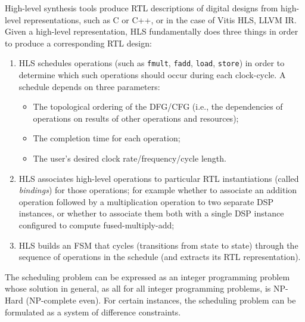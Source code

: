 High-level synthesis tools produce RTL descriptions of digital designs from high-level representations, such as C or C++\cite{10.1145/2514740, ferrandi2021bambu}, or in the case of Vitis HLS, LLVM IR.
Given a high-level representation, HLS fundamentally does three things in order to produce a corresponding RTL design:
\begin{enumerate}
	\item HLS schedules operations (such as \texttt{fmult}, \texttt{fadd}, \texttt{load}, \texttt{store}) in order to determine which such operations should occur during each clock-cycle. A schedule depends on three parameters:
	      \begin{itemize}
		      \item The topological ordering of the DFG/CFG (i.e., the dependencies of operations on results of other operations and resources);
		      \item The completion time for each operation;
		      \item The user's desired clock rate/frequency/cycle length.
	      \end{itemize}
	\item HLS associates high-level operations to particular RTL instantiations (called \emph{bindings}) for those operations;
	for example whether to associate an addition operation followed by a multiplication operation to two separate DSP instances, or whether to associate them both with a single DSP instance configured to compute fused-multiply-add;
	\item HLS builds an FSM that cycles (transitions from state to state) through the sequence of operations in the schedule (and extracts its RTL representation).
\end{enumerate}
The scheduling problem can be expressed as an integer programming problem\cite{tuprints9272} whose solution in general, as all for all integer programming problems, is NP-Hard (NP-complete even).
For certain instances, the scheduling problem can be formulated as a system of difference constraints.

